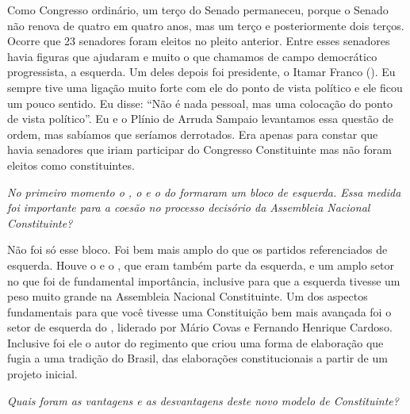 Como Congresso ordinário, um terço do Senado permaneceu, porque o Senado
não renova de quatro em quatro anos, mas um terço e posteriormente dois
terços. Ocorre que 23 senadores foram eleitos no pleito anterior. Entre
esses senadores havia figuras que ajudaram e muito o que chamamos de
campo democrático progressista, a esquerda. Um deles depois foi
presidente, o Itamar Franco (). Eu sempre tive uma ligação muito
forte com ele do ponto de vista político e ele ficou um pouco sentido.
Eu disse: ``Não é nada pessoal, mas uma colocação do ponto de vista
político''. Eu e o Plínio de Arruda Sampaio levantamos essa questão de
ordem, mas sabíamos que seríamos derrotados. Era apenas para constar que
havia senadores que iriam participar do Congresso Constituinte mas não
foram eleitos como constituintes.

\medskip

\noindent\emph{No primeiro momento o , o  e o do formaram um bloco de
esquerda. Essa medida foi importante para a coesão no processo decisório
da Assembleia Nacional Constituinte?}

Não foi só esse bloco. Foi bem mais amplo do que os
partidos referenciados de esquerda. Houve o  e o , que eram também
parte da esquerda, e um amplo setor no  que foi de fundamental
importância, inclusive para que a esquerda tivesse um peso muito grande
na Assembleia Nacional Constituinte. Um dos aspectos fundamentais para
que você tivesse uma Constituição bem mais avançada foi o setor de
esquerda do , liderado por Mário Covas e Fernando Henrique Cardoso.
Inclusive foi ele o autor do regimento que criou uma forma de elaboração
que fugia a uma tradição do Brasil, das elaborações constitucionais a
partir de um projeto inicial.

\medskip

\noindent\emph{Quais foram as vantagens e as desvantagens deste novo modelo de
Constituinte?}

